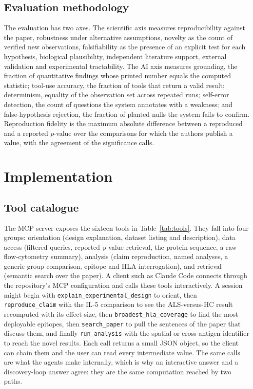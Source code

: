 \documentclass[11pt]{article}
\begin{document}
\subsection{Evaluation methodology}
The evaluation has two axes. The scientific axis measures reproducibility against the paper, robustness
under alternative assumptions, novelty as the count of verified new observations, falsifiability as the
presence of an explicit test for each hypothesis, biological plausibility, independent literature
support, external validation and experimental tractability. The AI axis measures grounding, the
fraction of quantitative findings whose printed number equals the computed statistic; tool-use
accuracy, the fraction of tools that return a valid result; determinism, equality of the observation
set across repeated runs; self-error detection, the count of questions the system annotates with a
weakness; and false-hypothesis rejection, the fraction of planted nulls the system fails to confirm.
Reproduction fidelity is the maximum absolute difference between a reproduced and a reported $p$-value
over the comparisons for which the authors publish a value, with the agreement of the significance
calls.

\section{Implementation}
\subsection{Tool catalogue}
The MCP server exposes the sixteen tools in Table~\ref{tab:tools}. They fall into four groups:
orientation (design explanation, dataset listing and description), data access (filtered queries,
reported-p-value retrieval, the protein sequence, a raw flow-cytometry summary), analysis (claim
reproduction, named analyses, a generic group comparison, epitope and HLA interrogation), and
retrieval (semantic search over the paper). A client such as Claude Code connects through the
repository's MCP configuration and calls these tools interactively. A session might begin with
\texttt{explain\_experimental\_design} to orient, then \texttt{reproduce\_claim} with the IL-5
comparison to see the ALS-versus-HC result recomputed with its effect size, then
\texttt{broadest\_hla\_coverage} to find the most deployable epitopes, then \texttt{search\_paper} to
pull the sentences of the paper that discuss them, and finally \texttt{run\_analysis} with the spatial
or cross-antigen identifier to reach the novel results. Each call returns a small JSON object, so the
client can chain them and the user can read every intermediate value. The same calls are what the
agents make internally, which is why an interactive answer and a discovery-loop answer agree: they are
the same computation reached by two paths.
\end{document}
